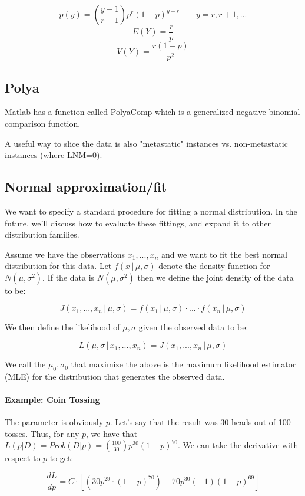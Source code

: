 \documentclass[a4paper]{article}
\begin{document}
\[p(y)=\binom{y-1}{r-1} p^r(1-p)^{y-r} \qquad y=r,r+1,...\]
\[E(Y)=\frac{r}{p}\]
\[V(Y)=\frac{r(1-p)}{p^2}\]

\subsection{Polya}
Matlab has a function called PolyaComp which is a generalized negative binomial comparison function.

A useful way to slice the data is also "metastatic" instances vs. non-metastatic instances (where LNM=0).



\subsection{Normal approximation/fit}
We want to specify a standard procedure for fitting a normal distribution. In the future, we'll discuss how to evaluate these fittings, and expand it to other distribution families.

Assume we have the observations $x_1,...,x_n$ and we want to fit the best normal distribution for this data.
Let $f(x\,|\,\mu, \sigma)$ denote the density function for $N(\mu, \sigma^2)$.
If the data is $N(\mu, \sigma^2)$ then we define the joint density of the data to be:

\[J(x_1,...,x_n\,|\,\mu, \sigma)=f(x_1\,|\,\mu, \sigma) \cdot ... \cdot f(x_n\,|\,\mu, \sigma)\]

We then define the likelihood of $\mu, \sigma$ given the observed data to be:

\[L(\mu, \sigma\,|\,x_1,...,x_n)=J(x_1,...,x_n\,|\,\mu, \sigma)\]

We call the $\mu_0, \sigma_0$ that maximize the above is the maximum likelihood estimator (MLE) for the distribution that generates the observed data.

\paragraph{Example: Coin Tossing}

The parameter is obviously $p$.
Let's say that the result was 30 heads out of 100 tosses.
Thus, for any $p$, we have that $L(p|D)=Prob(D|p)=\binom{100}{30}p^{30}(1-p)^{70}$.
We can take the derivative with respect to $p$ to get:

\[\frac{dL}{dp}=C \cdot [(30 p^{29} \cdot (1-p)^{70}) + 70p^{30}(-1)(1-p)^{69}]\]
\end{document}
